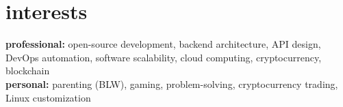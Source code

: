 \documentclass[a4paper,nocolors]{cv-friggeri-x}
\begin{document}

\section{interests}

\textbf{professional:} open-source development, backend architecture, API design, DevOps automation, software scalability, cloud computing, cryptocurrency, blockchain \\
\textbf{personal:} parenting (BLW), gaming, problem-solving, cryptocurrency trading, Linux customization  
\end{document}
